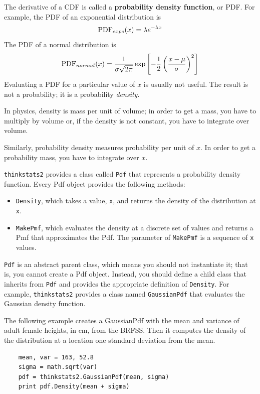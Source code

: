 \documentclass[12pt]{book}
\begin{document}
The derivative of a CDF is called a {\bf probability density function},
or PDF.  For example, the PDF of an exponential distribution is
%
\[ \mathrm{PDF}_{expo}(x) = \lambda e^{-\lambda x}   \]
%
The PDF of a normal distribution is
%
\[ \mathrm{PDF}_{normal}(x) = \frac{1}{\sigma \sqrt{2 \pi}} 
                 \exp \left[ -\frac{1}{2} 
                 \left( \frac{x - \mu}{\sigma} \right)^2 \right]  \]
%
Evaluating a PDF for a particular value of $x$ is usually not useful.
The result is not a probability; it is a probability {\em density}.

In physics, density is mass per unit of
volume; in order to get a mass, you have to multiply by volume or,
if the density is not constant, you have to integrate over volume.

Similarly, probability density measures probability per unit of $x$.
In order to get a probability mass, you have to integrate over $x$.

{\tt thinkstats2} provides a class called {\tt Pdf} that represents
a probability density function.  Every Pdf object provides the
following methods:

\begin{itemize}

\item {\tt Density}, which takes a value, {\tt x}, and returns the
  density of the distribution at {\tt x}.

\item {\tt MakePmf}, which evaluates the density at a discrete set of
  values and returns a Pmf that approximates the Pdf.  The parameter
  of {\tt MakePmf} is a sequence of {\tt x} values.

\end{itemize}  

{\tt Pdf} is an abstract parent class, which means you should not
instantiate it; that is, you cannot create a Pdf object.
Instead, you should define a child class that inherits from {\tt Pdf}
and provides the appropriate definition of {\tt Density}.  For
example, {\tt thinkstats2} provides a class named {\tt GaussianPdf}
that evaluates the Gaussian density function.

The following example creates a GaussianPdf with the mean and variance
of adult female heights, in cm, from the BRFSS.  Then it computes the
density of the distribution at a location one standard deviation from
the mean.

\begin{verbatim}
    mean, var = 163, 52.8
    sigma = math.sqrt(var)
    pdf = thinkstats2.GaussianPdf(mean, sigma)
    print pdf.Density(mean + sigma)
\end{verbatim}
\end{document}

